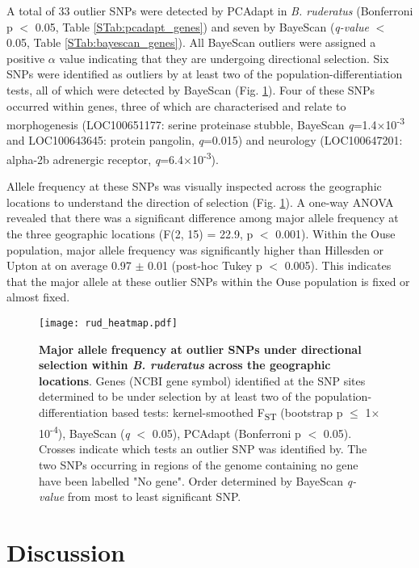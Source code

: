 \documentclass[12pt]{article}
\begin{document}
\begin{linenumbers}
	A total of 33 outlier SNPs were detected by PCAdapt in \emph{B. ruderatus} (Bonferroni p $<$ 0.05, Table \ref{STab:pcadapt_genes}) and seven by BayeScan (\emph{q-value} $<$ 0.05, Table \ref{STab:bayescan_genes}). All BayeScan outliers were assigned a positive $\alpha$ value indicating that they are undergoing directional selection. 
	Six SNPs were identified as outliers by at least two of the population-differentiation tests, all of which were detected by BayeScan (Fig. \ref{fig:rud_heat}). Four of these SNPs occurred within genes, three of which are characterised and relate to morphogenesis (LOC100651177: serine proteinase stubble, BayeScan \emph{q}=1.4$\times$10\textsuperscript{-3} and LOC100643645: protein pangolin, \emph{q}=0.015) and neurology (LOC100647201: alpha-2b adrenergic receptor, \emph{q}=6.4$\times$10\textsuperscript{-3}).
		
	Allele frequency at these SNPs was visually inspected across the geographic locations to understand the direction of selection (Fig. \ref{fig:rud_heat}). 
	A one-way ANOVA revealed that there was a significant difference among major allele frequency at the three geographic locations (F(2, 15) = 22.9, p $<$ 0.001).
	Within the Ouse population, major allele frequency was significantly higher than Hillesden or Upton at on average 0.97 $\pm$ 0.01 (post-hoc Tukey p $<$ 0.005). This indicates that the major allele at these outlier SNPs within the Ouse population is fixed or almost fixed. 
		
	\begin{figure}[ht!]
		\centering
		\texttt{[image: rud\_heatmap.pdf]}
		\captionsetup{width=0.88\linewidth}
		\caption{\textbf{Major allele frequency at outlier SNPs under directional selection within \emph{B. ruderatus} across the geographic locations}. Genes (NCBI gene symbol) identified at the SNP sites determined to be under selection by at least two of the population-differentiation based tests: kernel-smoothed F\textsubscript{ST} (bootstrap p $\leq$ 1$\times$10\textsuperscript{-4}), BayeScan (\emph{q} $<$ 0.05), PCAdapt (Bonferroni p $<$ 0.05). Crosses indicate which tests an outlier SNP was identified by. The two SNPs occurring in regions of the genome containing no gene have been labelled "No gene". Order determined by BayeScan \emph{q-value} from most to least significant SNP.}
		\label{fig:rud_heat}
	\end{figure}
	
   		
    \section{Discussion}
    

\end{linenumbers}
\end{document}
